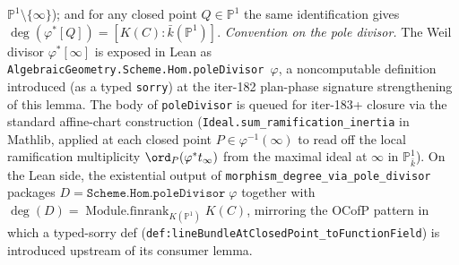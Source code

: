 \begin{lemma}
  \(\mathbb P^1 \setminus \{\infty\}\)); and for any closed point
  \(Q \in \mathbb P^1\) the same identification gives
  \(\deg(\varphi^*[Q]) = [K(C):\bar k(\mathbb P^1)]\).
  \emph{Convention on the pole divisor.} The Weil divisor
  \(\varphi^*[\infty]\) is exposed in Lean as
  \texttt{AlgebraicGeometry.Scheme.Hom.poleDivisor \(\varphi\)}, a
  noncomputable definition introduced (as a typed \texttt{sorry}) at the
  iter-182 plan-phase signature strengthening of this lemma. The body of
  \texttt{poleDivisor} is queued for iter-183+ closure via the standard
  affine-chart construction (\texttt{Ideal.sum\_ramification\_inertia}
  in Mathlib, applied at each closed point \(P \in \varphi^{-1}(\infty)\)
  to read off the local ramification multiplicity
  \(\ord_P(\varphi^* t_\infty)\) from the maximal ideal at \(\infty\) in
  \(\mathbb P^1_{\bar k}\)). On the Lean side, the existential output of
  \texttt{morphism\_degree\_via\_pole\_divisor} packages
  \(D = \texttt{Scheme.Hom.poleDivisor}\;\varphi\) together with
  \(\deg(D) = \operatorname{Module.finrank}_{K(\mathbb P^1)} K(C)\),
  mirroring the OCofP pattern in which a typed-sorry def
  (\texttt{def:lineBundleAtClosedPoint_toFunctionField}) is introduced
  upstream of its consumer lemma.
\end{lemma}
